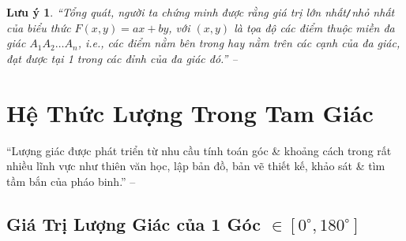 \documentclass{article}
\numberwithin{equation}{section}
\newtheorem{remark}{Lưu ý}[section]
\begin{document}
\begin{remark}
	``Tổng quát, người ta chứng minh được rằng giá trị lớn nhất\emph{\texttt{/}}nhỏ nhất của biểu thức $F(x,y) = ax + by$, với $(x,y)$ là tọa độ các điểm thuộc miền đa giác $A_1A_2\ldots A_n$, i.e., các điểm nằm bên trong hay nằm trên các cạnh của đa giác, đạt được tại 1 trong các đỉnh của đa giác đó.'' -- \cite[p. 29]{Khoai_Anh_Tan_Thang_Anh_Cuong_Duong_Dang_Ha_Hanh_Hong_Son_Tuan_Vuong_Toan_10_tap_1}
\end{remark}


\section{Hệ Thức Lượng Trong Tam Giác}
``Lượng giác được phát triển từ nhu cầu tính toán góc \& khoảng cách trong rất nhiều lĩnh vực như thiên văn học, lập bản đồ, bản vẽ thiết kế, khảo sát \& tìm tầm bắn của pháo binh.'' -- \cite[p. 33]{Khoai_Anh_Tan_Thang_Anh_Cuong_Duong_Dang_Ha_Hanh_Hong_Son_Tuan_Vuong_Toan_10_tap_1}

\subsection{Giá Trị Lượng Giác của 1 Góc $\in[0^\circ,180^\circ]$}
\end{document}
